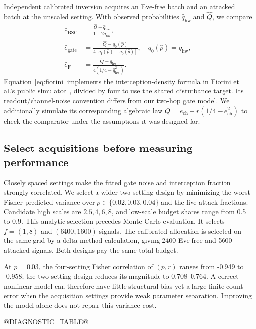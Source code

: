 Independent calibrated inversion acquires an Eve-free batch and an attacked batch at the
unscaled setting. With observed probabilities $\widehat q_{\mathrm{hw}}$ and $\widehat Q$,
we compare
\begin{align}
 \widehat e_{\mathrm{BSC}}&=\frac{\widehat Q-\widehat q_{\mathrm{hw}}}{1-2\widehat q_{\mathrm{hw}}},
 \label{eq:bsc}\\
 \widehat e_{\mathrm{gate}}&=\frac{\widehat Q-q_0(\widehat p)}{4[q_I(\widehat p)-q_0(\widehat p)]},
 \quad q_0(\widehat p)=\widehat q_{\mathrm{hw}}, \label{eq:calgate}\\
 \widehat e_{\mathrm F}&=\frac{\widehat Q-\widehat q_{\mathrm{hw}}}{4(1/4-\widehat q_{\mathrm{hw}}^2)}.
 \label{eq:fiorini}
\end{align}
Equation~\eqref{eq:fiorini} implements the interception-density formula in Fiorini et al.'s
public simulator~\cite{fiorini2026}, divided by four to use the shared disturbance target.
Its readout/channel-noise convention differs from our two-hop gate model. We additionally
simulate its corresponding algebraic law $Q=e_{\mathrm{ch}}+r(1/4-e_{\mathrm{ch}}^2)$ to check the comparator
under the assumptions it was designed for.

\subsection{Select acquisitions before measuring performance}
Closely spaced settings make the fitted gate noise and interception fraction strongly
correlated. We select a wider two-setting design by minimizing the worst Fisher-predicted
variance over $p\in\{0.02,0.03,0.04\}$ and the five attack fractions. Candidate high scales
are $2.5,4,6,8$, and low-scale budget shares range from 0.5 to 0.9. This analytic selection
precedes Monte Carlo evaluation. It selects $f=(1,8)$ and $(6400,1600)$ signals.
The calibrated allocation is selected on the same grid by a delta-method calculation,
giving 2400 Eve-free and 5600 attacked signals. Both designs pay the same total budget.

At $p=0.03$, the four-setting Fisher correlation of $(p,r)$ ranges from -0.949 to -0.958;
the two-setting design reduces its magnitude to 0.708--0.764. A correct nonlinear model
can therefore have little structural bias yet a large finite-count error when the
acquisition settings provide weak parameter separation. Improving the model alone does
not repair this variance cost.

@DIAGNOSTIC_TABLE@

